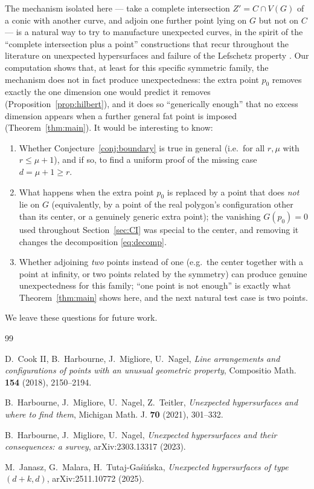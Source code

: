 \documentclass[11pt]{amsart}
\theoremstyle{plain}
\theoremstyle{definition}
\begin{document}
The mechanism isolated here --- take a complete intersection $Z'=C\cap V(G)$ of a conic with another curve, and adjoin one further point lying on $G$ but not on $C$ --- is a natural way to try to manufacture unexpected curves, in the spirit of the ``complete intersection plus a point'' constructions that recur throughout the literature on unexpected hypersurfaces and failure of the Lefschetz property \cite{HMNT,Survey}. Our computation shows that, at least for this specific symmetric family, the mechanism does not in fact produce unexpectedness: the extra point $p_0$ removes exactly the one dimension one would predict it removes (Proposition~\ref{prop:hilbert}), and it does so ``generically enough'' that no excess dimension appears when a further general fat point is imposed (Theorem~\ref{thm:main}). It would be interesting to know:
\begin{enumerate}
\item Whether Conjecture~\ref{conj:boundary} is true in general (i.e.\ for all $r,\mu$ with $r\le \mu+1$), and if so, to find a uniform proof of the missing case $d=\mu+1\ge r$.
\item What happens when the extra point $p_0$ is replaced by a point that does \emph{not} lie on $G$ (equivalently, by a point of the real polygon's configuration other than its center, or a genuinely generic extra point); the vanishing $G(p_0)=0$ used throughout Section~\ref{sec:CI} was special to the center, and removing it changes the decomposition \eqref{eq:decomp}.
\item Whether adjoining \emph{two} points instead of one (e.g.\ the center together with a point at infinity, or two points related by the symmetry) can produce genuine unexpectedness for this family; ``one point is not enough'' is exactly what Theorem~\ref{thm:main} shows here, and the next natural test case is two points.
\end{enumerate}
We leave these questions for future work.

\begin{thebibliography}{99}

 D.~Cook II, B.~Harbourne, J.~Migliore, U.~Nagel, \emph{Line arrangements and configurations of points with an unusual geometric property}, Compositio Math. \textbf{154} (2018), 2150--2194.

 B.~Harbourne, J.~Migliore, U.~Nagel, Z.~Teitler, \emph{Unexpected hypersurfaces and where to find them}, Michigan Math. J. \textbf{70} (2021), 301--332.

 B.~Harbourne, J.~Migliore, U.~Nagel, \emph{Unexpected hypersurfaces and their consequences: a survey}, arXiv:2303.13317 (2023).

 M.~Janasz, G.~Malara, H.~Tutaj-Ga\'{s}i\'{n}ska, \emph{Unexpected hypersurfaces of type $(d+k,d)$}, arXiv:2511.10772 (2025).

\end{thebibliography}
\end{document}
